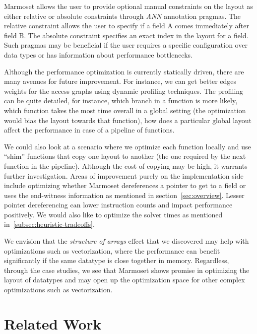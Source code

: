 \documentclass[acmsmall,review,anonymous]{acmart}\settopmatter{printfolios=true,printccs=false,printacmref=false}
\newcommand{\system}{{\sc Marmoset}\xspace}
\begin{document}
\system allows the user to provide optional manual constraints on the layout
as either relative or absolute constraints through \textit{ANN} annotation pragmas.
The relative constraint allows the user to specify if a field A comes immediately after
field B. The absolute constraint specifies an exact index in the layout for a field. 
Such pragmas may be beneficial if the user requires a specific configuration over data
types or has information about performance bottlenecks.


Although the performance optimization is currently statically driven, there are many avenues for future
improvement. For instance, we can get better edges weights for the access graphs
using dynamic profiling techniques. The profiling can be quite detailed, for
instance, which branch in a function is more likely, which function takes the
most time overall in a global setting (the optimization would bias the layout
towards that function), how does a particular global layout affect the
performance in case of a pipeline of functions.

We could also look at a scenario where we optimize each function locally and 
use ``shim'' functions that copy one layout to another (the one required by the
next function in the pipeline). Although the cost of copying may be high, it warrants
further investigation. Areas of improvement purely on the implementation side include 
optimizing whether \system dereferences a pointer to get to a field or uses the end-witness
information as mentioned in section~\ref{sec:overview}. Lesser pointer dereferencing 
can lower instruction counts and impact performance positively. We would also like to 
optimize the solver times as mentioned in~\ref{subsec:heuristic-tradeoffs}.

We envision that the \textit{structure of arrays} effect that we discovered may help 
with optimizations such as vectorization, where the performance can benefit significantly
if the same datatype is close together in memory. Regardless, through the case studies, we see 
that \system shows promise in optimizing the layout of datatypes and may open up 
the optimization space for other complex optimizations such as vectorization.
 \section{Related Work}

\end{document}

